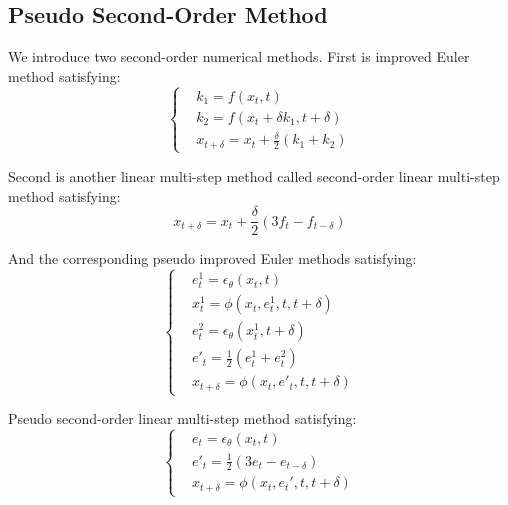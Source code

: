 \documentclass{article}
\begin{document}
\subsection{Pseudo Second-Order Method}
\label{som_sec}
We introduce two second-order numerical methods. First is improved Euler method satisfying:
\begin{equation}
   \begin{cases}
      &k_1 = f(x_t, t) \\
      &k_2 = f(x_t+\delta k_1, t+\delta) \\
      &x_{t+\delta} = x_t + \frac{\delta}{2}(k_1+k_2)
   \end{cases}
\end{equation}

Second is another linear multi-step method called second-order linear multi-step method satisfying:
\begin{equation}
   x_{t+\delta} = x_t + \frac{\delta}{2}(3f_t - f_{t-\delta})
\end{equation}

And the corresponding pseudo improved Euler methods satisfying:
\begin{equation}
   \begin{cases}
      &e^1_t = \epsilon_\theta(x_t, t) \\
      &x^1_t = \phi(x_t, e_t^1, t, t+\delta) \\
      &e^2_t = \epsilon_\theta(x_t^1, t+\delta) \\
      &e'_t = \frac{1}{2}(e^1_t + e^2_t) \\
      &x_{t+\delta} = \phi(x_t, e'_t, t, t+\delta) 
   \end{cases}
   \label{eq_pie}
\end{equation}

Pseudo second-order linear multi-step method satisfying:
\begin{equation}
   \begin{cases}
      &e_t = \epsilon_\theta(x_t, t) \\
      &e'_t = \frac{1}{2}(3e_t - e_{t-\delta}) \\
      &x_{t+\delta} = \phi(x_t, e_t', t, t+\delta)
   \end{cases}
   \label{eq_plms2}
\end{equation}
\end{document}
